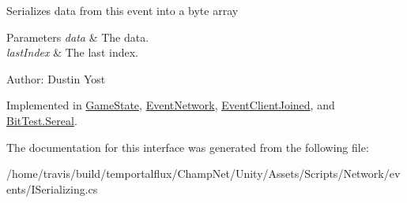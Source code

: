 Serializes data from this event into a byte array 


\begin{DoxyParams}{Parameters}
{\em data} & The data.\\
\hline
{\em last\-Index} & The last index.\\
\hline
\end{DoxyParams}


Author\-: Dustin Yost 

Implemented in \hyperlink{class_game_state_af57a06c77a763e8b57841bab79c9b12f}{Game\-State}, \hyperlink{class_event_network_ae2574cdc2bb836f3e41628ff1c095238}{Event\-Network}, \hyperlink{class_event_client_joined_a10a9f8d247e3446fec1cc7a1eb13e6a0}{Event\-Client\-Joined}, and \hyperlink{class_bit_test_1_1_sereal_ad5a8343dbe518ffa4c1b99db449638ad}{Bit\-Test.\-Sereal}.



The documentation for this interface was generated from the following file\-:\begin{DoxyCompactItemize}
\item 
/home/travis/build/temportalflux/\-Champ\-Net/\-Unity/\-Assets/\-Scripts/\-Network/events/I\-Serializing.\-cs\end{DoxyCompactItemize}
